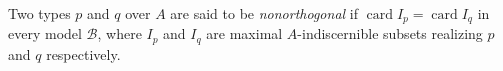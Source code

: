Two types $p$ and $q$ over $A$ are said to be \textit{nonorthogonal} if $\operatorname{card} I_p = \operatorname{card} I_q$ in every model $\mathcal{B}$, where $I_p$ and $I_q$ are maximal $A$-indiscernible subsets realizing $p$ and $q$ respectively.
